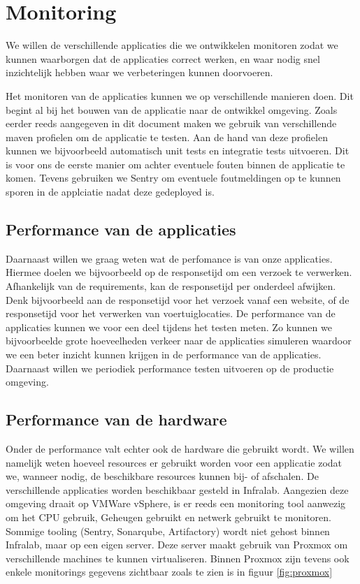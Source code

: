 \chapter{Monitoring}
We willen de verschillende applicaties die we ontwikkelen monitoren zodat we kunnen waarborgen dat de applicaties correct werken, en waar nodig snel inzichtelijk hebben waar we verbeteringen kunnen doorvoeren.

Het monitoren van de applicaties kunnen we op verschillende manieren doen. Dit begint al bij het bouwen van de applicatie naar de ontwikkel omgeving. Zoals eerder reeds aangegeven in dit document maken we gebruik van verschillende maven profielen om de applicatie te testen. Aan de hand van deze profielen kunnen we bijvoorbeeld automatisch unit tests en integratie tests uitvoeren. Dit is voor ons de eerste manier om achter eventuele fouten binnen de applicatie te komen.
Tevens gebruiken we Sentry om eventuele foutmeldingen op te kunnen sporen in de applciatie nadat deze gedeployed is.

\section{Performance van de applicaties}
Daarnaast willen we graag weten wat de perfomance is van onze applicaties. Hiermee doelen we bijvoorbeeld op de responsetijd om een verzoek te verwerken. Afhankelijk van de requirements, kan de responsetijd per onderdeel afwijken. Denk bijvoorbeeld aan de responsetijd voor het verzoek vanaf een website, of de responsetijd voor het verwerken van voertuiglocaties.
De performance van de applicaties kunnen we voor een deel tijdens het testen meten. Zo kunnen we bijvoorbeelde grote hoeveelheden verkeer naar de applicaties simuleren waardoor we een beter inzicht kunnen krijgen in de performance van de applicaties.
Daarnaast willen we periodiek performance testen uitvoeren op de productie omgeving.

\section{Performance van de hardware}
Onder de performance valt echter ook de hardware die gebruikt wordt. We willen namelijk weten hoeveel resources er gebruikt worden voor een applicatie zodat we, wanneer nodig, de beschikbare resources kunnen bij- of afschalen.
De verschillende applicaties worden beschikbaar gesteld in Infralab. Aangezien deze omgeving draait op VMWare vSphere, is er reeds een monitoring tool aanwezig om het CPU gebruik, Geheugen gebruikt en netwerk gebruikt te monitoren.
\newline
Sommige tooling (Sentry, Sonarqube, Artifactory) wordt niet gehost binnen Infralab, maar op een eigen server. Deze server maakt gebruik van Proxmox om verschillende machines te kunnen virtualiseren. Binnen Proxmox zijn tevens ook enkele monitorings gegevens zichtbaar zoals te zien is in figuur \ref{fig:proxmox}

